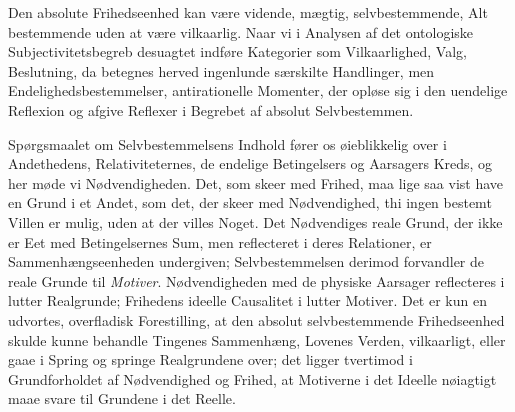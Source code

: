 \documentclass[12pt]{article}
\begin{document}
Den absolute Frihedseenhed kan være vidende, mægtig, selvbestemmende,
Alt bestemmende uden at være vilkaarlig. Naar vi i Analysen af det
ontologiske Subjectivitetsbegreb desuagtet indføre Kategorier som
Vilkaarlighed, Valg, Beslutning, da betegnes herved ingenlunde
særskilte Handlinger, men Endelighedsbestemmelser, antirationelle
Momenter, der opløse sig i den uendelige Reflexion og afgive
Reflexer i Begrebet af absolut Selvbestemmen.

Spørgsmaalet om Selvbestemmelsens Indhold fører os øieblikkelig over
i Andethedens, Relativiteternes, de endelige Betingelsers og
Aarsagers Kreds, og her møde vi Nødvendigheden. Det, som skeer med
Frihed, maa lige saa vist have en Grund i et Andet, som det, der
skeer med Nødvendighed, thi ingen bestemt Villen er mulig, uden at
der villes Noget. Det Nødvendiges reale Grund, der ikke er Eet med
Betingelsernes Sum, men reflecteret i deres Relationer, er
Sammenhængseenheden undergiven; Selvbestemmelsen derimod forvandler
de reale Grunde til \emph{Motiver}. Nødvendigheden med de physiske
Aarsager reflecteres i lutter Realgrunde; Frihedens ideelle
Causalitet i lutter Motiver. Det er kun en udvortes, overfladisk
Forestilling, at den absolut selvbestemmende Frihedseenhed skulde
kunne behandle Tingenes Sammenhæng, Lovenes Verden, vilkaarligt,
eller gaae i Spring og springe Realgrundene over; det ligger
tvertimod i Grundforholdet af Nødvendighed og Frihed, at Motiverne i
det Ideelle nøiagtigt maae svare til Grundene i det Reelle.
\end{document}
